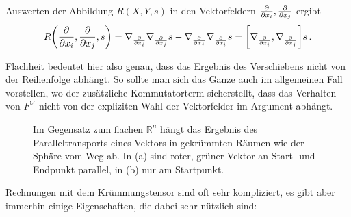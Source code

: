 \documentclass[../H_Analysis_main.tex]{subfiles}
\begin{document}
\begin{bsp}
Auswerten der Abbildung $R(X, Y, s)$ in den Vektorfeldern $\pdv{x_i}, \pdv{x_j}$ ergibt
\begin{equation*}
R\qty(\pdv{x_i}, \pdv{x_j}, s) = \nabla_{\pdv{x_i}} \nabla_{\pdv{x_j}} s - \nabla_{\pdv{x_j}} \nabla_{\pdv{x_i}} s = \qty[\nabla_{\pdv{x_i}}, \nabla_{\pdv{x_j}}] s \, .
\end{equation*}

Flachheit bedeutet hier also genau, dass das Ergebnis des Verschiebens nicht von der Reihenfolge abhängt. So sollte man sich das Ganze auch im allgemeinen Fall vorstellen, wo der zusätzliche Kommutatorterm sicherstellt, dass das Verhalten von $F^\nabla$ nicht von der expliziten Wahl der Vektorfelder im Argument abhängt.
\end{bsp}


\iffalse
\begin{figure}
\centering

\subfloat[Parallelogram im $\mathbb{R}^2$]{\texttt{[image: Bilder/parallelogram\_geschlossen.pdf]}}
\subfloat[Parallelogram auf der 2-Sphäre]{\texttt{[image: Bilder/parallelogram\_ungeschlossen.pdf]}}

\caption[Parallelogramme]{Im Gegensatz zum flachen $\mathbb{R}^n$ ist es in gekrümmten Räumen ist es nicht mehr so, dass sich Parallelogramme gleicher Vektoren schließen.}
\label{fig:parallelograme}
\end{figure}
\fi


\begin{figure}
\centering

\hspace{0.06\textwidth}%

\caption[Paralleltransport]{Im Gegensatz zum flachen $\mathbb{R}^n$ hängt das Ergebnis des Paralleltransports eines Vektors in gekrümmten Räumen wie der Sphäre vom Weg ab. In (a) sind roter, grüner Vektor an Start- und Endpunkt parallel, in (b) nur am Startpunkt.}
\label{fig:paralleltransport}
\end{figure}


Rechnungen mit dem Krümmungstensor sind oft sehr kompliziert, es gibt aber immerhin einige Eigenschaften, die dabei sehr nützlich sind:
\end{document}

